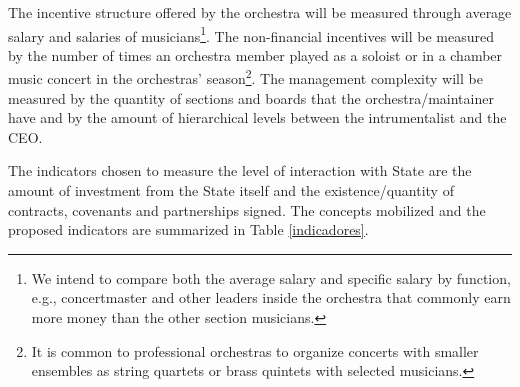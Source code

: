 \documentclass[a4paper, 12pt, openright, oneside, german, french, brazil, english, article]{abntex2}
\begin{document}
	
	The incentive structure offered by the orchestra will be measured through average salary and salaries of musicians\footnote{We intend to compare both the average salary and specific salary by function, e.g., concertmaster and other leaders inside the orchestra that commonly earn more money than the other section musicians.}. The non-financial incentives will be measured by the number of times an orchestra member played as a soloist or in a chamber music concert in the orchestras' season\footnote{It is common to professional orchestras to organize concerts with smaller ensembles as string quartets or brass quintets with selected musicians.}. The management complexity will be measured by the quantity of sections and boards that the orchestra/maintainer have and by the amount of hierarchical levels between the intrumentalist and the CEO.
	
	
	The indicators chosen to measure the level of interaction with State are the amount of investment from the State itself and the existence/quantity of contracts, covenants and partnerships signed. The concepts mobilized and the proposed indicators are summarized in Table \ref{indicadores}.
	
	
\end{document}
